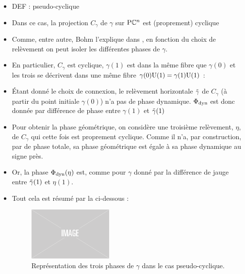 \begin{itemize}
	\item DEF : pseudo-cyclique
	
	\item Dans ce cas, la projection $C_\gamma$ de $\gamma$ sur $\text{\normalfont P}\mathbb{C}^{n}$ est (proprement) cyclique
	
	\item Comme, entre autre, Bohm l'explique dans \cite{bohm_geometric_2003}, en fonction du choix de relèvement on peut isoler les différentes phases de $\gamma$. 
	
	\item En particulier, $C_\gamma$ est cyclique, $\gamma(1)$ est dans la même fibre que $\gamma(0)$ et les trois se décrivent dans une même fibre $\gamma(0)\text{\normalfont U}(1) = \gamma(1)\text{\normalfont U}(1)$ :
	
	\item Étant donné le choix de connexion, le relèvement horizontale $\Tilde{\gamma}$ de $C_\gamma$ (à partir du point initiale $\gamma(0)$) n'a pas de phase dynamique. $\Phi_{\text{\normalfont dyn}}$ est donc donnée par différence de phase entre $\gamma(1)$ et $\Tilde{\gamma}(1)$
	
	\item Pour obtenir la phase géométrique, on considère une troisième relèvement, $\eta$, de $C_\gamma$ qui cette fois est proprement cyclique. Comme il n'a, par construction, par de phase totale, sa phase géométrique est égale à sa phase dynamique au signe près.
	
	\item Or, la phase $\Phi_{\text{\normalfont dyn}}(\eta)$ est, comme pour $\gamma$ donné par la différence de jauge entre $\Tilde{\gamma}(1)$ et $\eta(1)$.
	
	\item Tout cela est résumé par la  ci-dessous :
	\begin{figure}[h]
		\includegraphics[width=0.4\textwidth]{fig/placeholder}
		\caption[Représentation des trois phases de $\gamma$ dans le cas pseudo-cyclique]{Représentation des trois phases de $\gamma$ dans le cas pseudo-cyclique.}
		\label{fig:phases_p-cycl}
	\end{figure}
	

\end{itemize}
